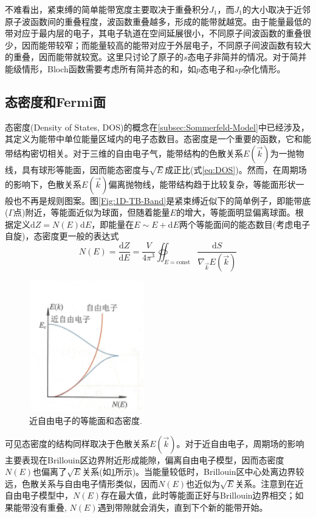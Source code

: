 不难看出，紧束缚的简单能带宽度主要取决于重叠积分$J_1$，而$J_1$的大小取决于近邻原子波函数间的重叠程度，波函数重叠越多，形成的能带就越宽。由于能量最低的带对应于最内层的电子，其电子轨道在空间延展很小，不同原子间波函数的重叠很少，因而能带较窄；而能量较高的能带对应于外层电子，不同原子间波函数有较大的重叠，因而能带就较宽。这里只讨论了原子的$s$态电子非简并的情况。对于简并能级情形，Bloch函数需要考虑所有简并态的和，如$p$态电子和$sp$杂化情形。%

\subsection{态密度和Fermi面}
态密度(Density of States, DOS)的概念在\ref{subsec:Sommerfeld-Model}中已经涉及，其定义为能带中单位能量区域内的电子态数目。态密度是一个重要的函数，它和能带结构密切相关。对于三维的自由电子气，能带结构的色散关系$E(\vec k)$为一抛物线，具有球形等能面，因而能态密度与$\sqrt{E}$成正比(式\eqref{eq:DOS})。然而，在周期场的影响下，色散关系$E(\vec k)$偏离抛物线，能带结构趋于比较复杂，等能面形状一般也不再是规则图案。图\ref{Fig:1D-TB-Band}是紧束缚近似下的简单例子，即能带底($\Gamma$点)附近，等能面近似为球面，但随着能量$E$的增大，等能面明显偏离球面。根据定义$\mathrm{d}Z=N(E)\mathrm{d}E$，即能量在$E\sim E+\mathrm{d}E$两个等能面间的能态数目(考虑电子自旋)，态密度更一般的表达式
\begin{equation}
	N(E)=\dfrac{\mathrm{d}Z}{\mathrm{d}E}=\dfrac{V}{4\pi^3}\oiint_{E=\mathrm{const}}\dfrac{\mathrm{d}S}{\nabla_{\vec k}E(\vec k)}
	\label{eq:DOS_definition}
\end{equation}
\begin{figure}[h!]
\centering
\vspace*{-0.10in}
\includegraphics[height=2.25in,width=2.00in,viewport=0 0 35 40,clip]{Figures/DOS_FE-model.png}
\caption{\small \textrm{近自由电子的等能面和态密度.}}%
\label{Fig:Fermi_Surface-1}
\end{figure}
可见态密度的结构同样取决于色散关系$E(\vec k)$。对于近自由电子，周期场的影响主要表现在Brillouin区边界附近形成能隙，偏离自由电子模型，因而态密度$N(E)$也偏离了$\sqrt{E}$关系(如\ref{Fig:Fermi_Surface-1}所示)。当能量较低时，Brillouin区中心处离边界较远，色散关系与自由电子情形类似，因而$N(E)$也近似为$\sqrt{E}$关系。注意到在近自由电子模型中，$N(E)$存在最大值，此时等能面正好与Brillouin边界相交；如果能带没有重叠, $N(E)$遇到带隙就会消失，直到下个新的能带开始。

